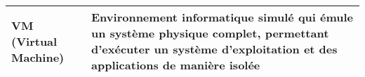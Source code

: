 \newpage

\begin{table}[ht!]
    \centering
    \small
    \begin{tabularx}{\textwidth}{|X|X|}
        \hline
        \textbf{VM (Virtual Machine)} & Environnement informatique simulé qui émule un système physique complet, permettant d'exécuter un système d'exploitation et des applications de manière isolée \\
        \hline
    \end{tabularx}
\end{table}